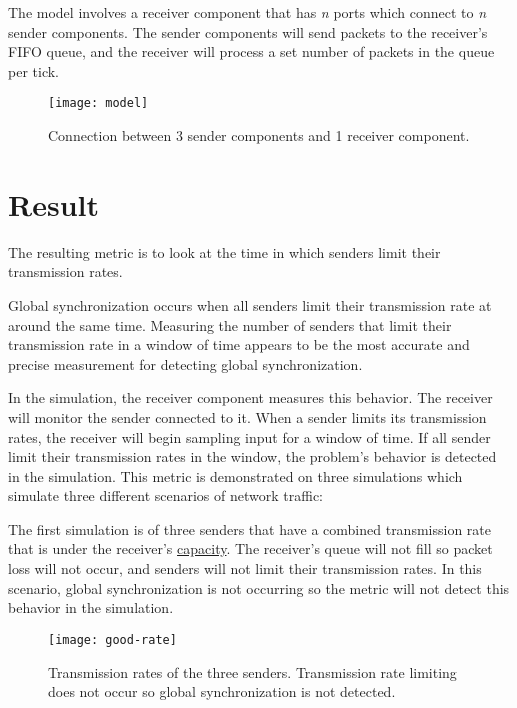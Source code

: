 \documentclass{article}
\begin{document}
The model involves a receiver component that has \textit{n} ports which connect to \textit{n} sender components. The sender components will send packets to the receiver's FIFO queue, and the receiver will process a set number of packets in the queue per tick. 

\begin{figure}[H]
	\centering
	\texttt{[image: model]}
	\caption{Connection between 3 sender components and 1 receiver component.}
\end{figure}

\section{Result} %

	The resulting metric is to look at the time in which senders limit their transmission rates.

	Global synchronization occurs when all senders limit their transmission rate at around the same time. Measuring the number of senders that limit their transmission rate in a window of time appears to be the most accurate and precise measurement for detecting global synchronization.
						
	In the simulation, the receiver component measures this behavior. The receiver will monitor the sender connected to it. When a sender limits its transmission rates, the receiver will begin sampling input for a window of time. If all sender limit their transmission rates in the window, the problem's behavior is detected in the simulation. This metric is demonstrated on three simulations which simulate three different scenarios of network traffic:
											
	The first simulation is of three senders that have a combined transmission rate that is under the receiver's \href{https://www.solarwinds.com/resources/it-glossary/network-capacity}{capacity}. The receiver's queue will not fill so packet loss will not occur, and senders will not limit their transmission rates. In this scenario, global synchronization is not occurring so the metric will not detect this behavior in the simulation.
	
	\begin{figure}[H]
		\centering
		\texttt{[image: good-rate]}
		\caption{Transmission rates of the three senders. Transmission rate limiting does not occur so global synchronization is not detected.}
	\end{figure}
\end{document}
